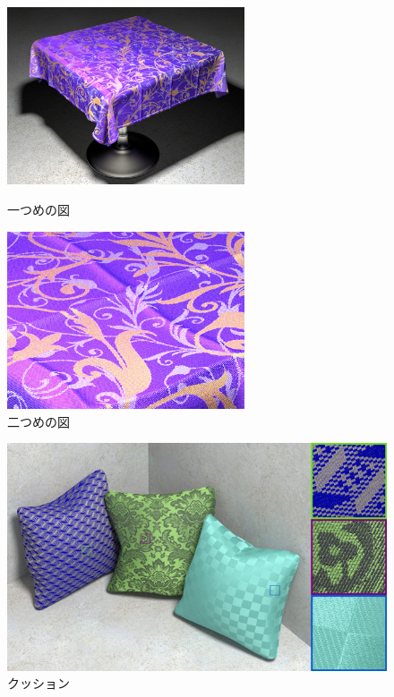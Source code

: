 \begin{figure}[htbp]
 \begin{minipage}{0.4\hsize}
  \begin{center}
   \includegraphics[width=70mm]{./img/mft_purple_cloth_ld.jpg}
  \end{center}
  \caption{一つめの図}
  \label{fig:one}
 \end{minipage}
 \begin{minipage}{0.75\hsize}
  \begin{center}
    \includegraphics[width=70mm]{./img/mft_zoom_ld.jpg}
  \end{center}
  \caption{二つめの図}
  \label{fig:two}
 \end{minipage}
\end{figure}

\begin{figure}[htbp]
  \centering
  \includegraphics[width=5.5in]{./img/cussions.jpg}
  \caption{クッション}
  \label{F}
\end{figure}

